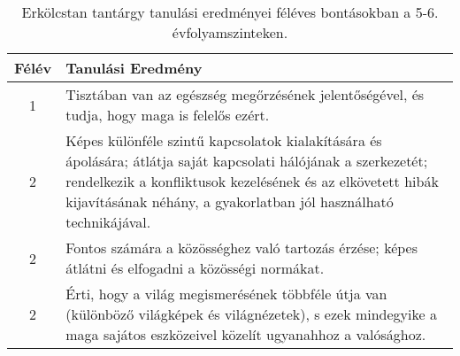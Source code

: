        
           \begin{longtable}{c | p{} }
            \caption[Erkölcstan 5-6.]{Erkölcstan tantárgy tanulási eredményei féléves bontásokban a 5-6. évfolyamszinteken. }  \\

            \textbf{Félév} & \textbf{Tanulási Eredmény} \\
            \hline
            \endhead
                                
                                          1 &  Tisztában van az egészség megőrzésének jelentőségével, és tudja, hogy maga is felelős ezért. \\ \hline
                                      
                                
                                          2 &  Képes különféle szintű kapcsolatok kialakítására és ápolására; átlátja saját kapcsolati hálójának a szerkezetét; rendelkezik a konfliktusok kezelésének és az elkövetett hibák kijavításának néhány, a gyakorlatban jól használható technikájával. \\ \hline
                                          2 &  Fontos számára a közösséghez való tartozás érzése; képes átlátni és elfogadni a közösségi normákat. \\ \hline
                                          2 &  Érti, hogy a világ megismerésének többféle útja van (különböző világképek és világnézetek), s ezek mindegyike a maga sajátos eszközeivel közelít ugyanahhoz a valósághoz. \\ \hline
                                      

\end{longtable}
